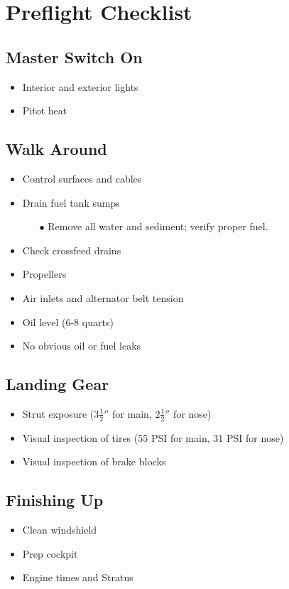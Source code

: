 \def\todoitem#1{
    \item[$\square$] #1 \dotfill
}

\section{Preflight Checklist}
\renewcommand{\rightmark}{Preflight Checklist}


\subsection{Master Switch On}

\begin{itemize}
    \todoitem{Interior and exterior lights}
    \todoitem{Pitot heat}
\end{itemize}

\subsection{Walk Around}

\begin{itemize}
    \todoitem{Control surfaces and cables}
    \todoitem{Drain fuel tank sumps}
    \begin{itemize}
        \item[$\bullet$] Remove all water and sediment; verify proper fuel.
    \end{itemize}
    \todoitem{Check crossfeed drains}
    \todoitem{Propellers}
    \todoitem{Air inlets and alternator belt tension}
    \todoitem{Oil level (6-8 quarts)}
    \todoitem{No obvious oil or fuel leaks}
\end{itemize}

\subsection{Landing Gear}

\begin{itemize}
    \todoitem{Strut exposure ($3\frac{1}{2}''$ for main, $2 \frac{1}{2}''$ for nose)}
    \todoitem{Visual inspection of tires (55 PSI for main, 31 PSI for nose)}
    \todoitem{Visual inspection of brake blocks}
\end{itemize}

\subsection{Finishing Up}

\begin{itemize}
    \todoitem{Clean windshield}
    \todoitem{Prep cockpit}
    \todoitem{Engine times and Stratus}
\end{itemize}
